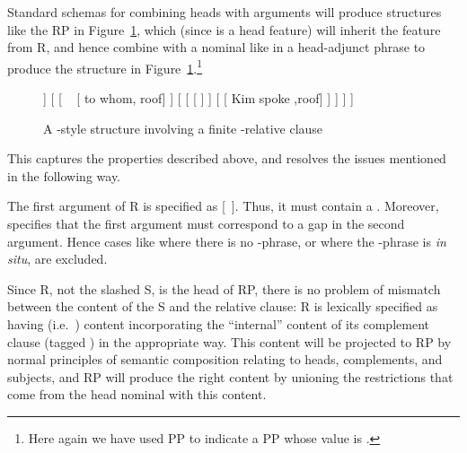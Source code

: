 \documentclass[output=paper,nonflat,draftmode]{./langsci/langscibook}
\begin{document}
Standard schemas for combining heads with arguments will produce structures like the RP in
Figure~\ref{fig:rc-3}, which (since  is a head feature) will inherit the
 feature from R, and hence combine with a nominal like  in a
head-adjunct phrase to produce the structure in Figure~\ref{fig:rc-3}.\footnote{Here again
  we have used PP  to indicate a PP whose  value is .}
\begin{figure}
  \begin{forest} %
   [{\ibar{N}\subtag{1}}%
      [{\idx{7} \ibar{N}\subtag{1}}  [ {person} ]  
      ]  
      [{} 
         [{}  ~
            [ {to whom}, roof] 
         ]
         [{}
            [{}     [ {\trace} ] ]
            [{}  [ {Kim spoke} ,roof] ]
         ]
      ]
   ]
   \end{forest}
   \caption{A \cite{Pollard:Sag:94}-style structure involving a finite -relative clause}
   \label{fig:rc-3}
\end{figure}

This captures the properties described above, and resolves the issues mentioned in the
following way.

The first argument of R is specified as [~]. Thus, it must contain
a . Moreover,  specifies that the first argument must
correspond to a gap in the second argument. Hence cases like  where there is no
-phrase, or where the -phrase is \emph{in situ}, are excluded.

Since R, not the slashed S, is the head of RP, there is no problem of mismatch between the
content of the S and the relative clause: R is lexically specified as having 
(i.e.\ ) content incorporating the ``internal'' content of its complement clause
(tagged ) in the appropriate way. This  content will be
projected to RP by normal principles of semantic composition relating to heads,
complements, and subjects, and RP will produce the right content by unioning the
restrictions that come from the head nominal with this  content.
\end{document}
